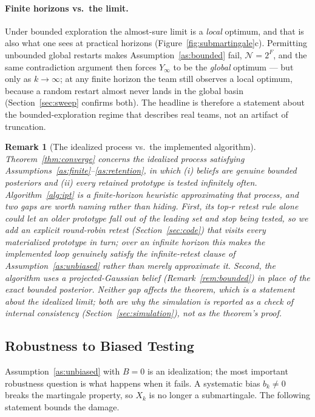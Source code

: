 \documentclass[11pt]{article}
\newtheorem{remark}{Remark}
\begin{document}
\paragraph{Finite horizons vs.\ the limit.}
Under bounded exploration the almost-sure limit is a \emph{local} optimum, and that is also what one sees at practical horizons (Figure~\ref{fig:submartingale}c). Permitting unbounded global restarts makes Assumption~\ref{as:bounded} fail, $\mathcal{N}=2^F$, and the same contradiction argument then forces $Y_\infty$ to be the \emph{global} optimum --- but only as $k\to\infty$; at any finite horizon the team still observes a local optimum, because a random restart almost never lands in the global basin (Section~\ref{sec:sweep} confirms both). The headline is therefore a statement about the bounded-exploration regime that describes real teams, not an artifact of truncation.

\begin{remark}[The idealized process vs.\ the implemented algorithm]
\label{rem:idealvsalgo}
Theorem~\ref{thm:converge} concerns the \emph{idealized} process satisfying Assumptions~\ref{as:finite}--\ref{as:retention}, in which (i) beliefs are genuine bounded posteriors and (ii) every retained prototype is tested infinitely often. Algorithm~\ref{alg:ipt} is a \emph{finite-horizon heuristic} approximating that process, and two gaps are worth naming rather than hiding. First, its top-$r$ retest rule alone could let an older prototype fall out of the leading set and stop being tested, so we add an explicit round-robin retest (Section~\ref{sec:code}) that visits every materialized prototype in turn; over an infinite horizon this makes the implemented loop genuinely satisfy the infinite-retest clause of Assumption~\ref{as:unbiased} rather than merely approximate it. Second, the algorithm uses a projected-Gaussian belief (Remark~\ref{rem:bounded}) in place of the exact bounded posterior. Neither gap affects the theorem, which is a statement about the idealized limit; both are why the simulation is reported as a check of \emph{internal consistency} (Section~\ref{sec:simulation}), not as the theorem's proof.
\end{remark}

\subsection{Robustness to Biased Testing}
\label{sec:bias}
Assumption~\ref{as:unbiased} with $B=0$ is an idealization; the most important robustness question is what happens when it fails. A systematic bias $b_k\neq0$ breaks the martingale property, so $X_k$ is no longer a submartingale. The following statement bounds the damage.
\end{document}
